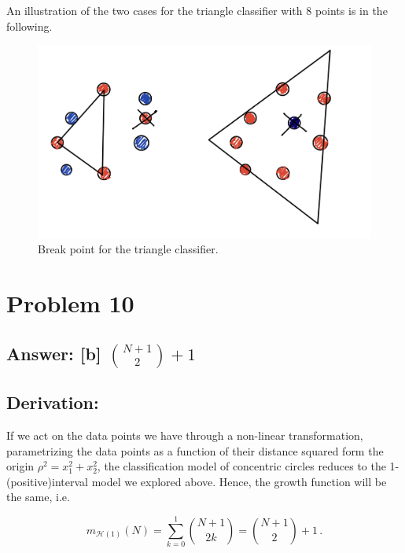 \documentclass[11pt]{article}
\begin{document}
An illustration of the two cases for the triangle classifier with \(8\)
points is in the following.

\begin{figure}
    \centering
    \includegraphics[scale=0.5]{Pset 3/IMG_0165.jpg}
    \caption{Break point for the triangle classifier.}
    \label{fig:my_label}
\end{figure}
        
    \hypertarget{problem-10}{%
\section{Problem 10}\label{problem-10}}

\hypertarget{answer-b-n1choose21}{%
\subsection{\texorpdfstring{Answer: {[}b{]}
\({N+1\choose2}+1\)}{Answer: {[}b{]} \{N+1\textbackslash{}choose2\}+1}}\label{answer-b-n1choose21}}

\hypertarget{derivation}{%
\subsection{Derivation:}\label{derivation}}

If we act on the data points we have through a non-linear
transformation, parametrizing the data points as a function of their
distance squared form the origin \(\rho^2=x_1^2+x_2^2\), the
classification model of concentric circles reduces to the
1-(positive)interval model we explored above. Hence, the growth function
will be the same, i.e.

\[
m_{\mathcal{H}(1)}(N)=\sum^1_{k=0} {N+1\choose2 k}={N+1\choose2}+1\,.
\]


    
    
    
\end{document}
